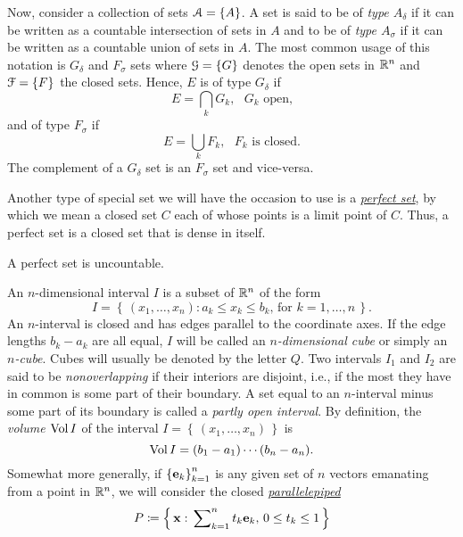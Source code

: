 Now, consider a collection of sets $\mathcal{A}=\{A\}$. A set is said to be of
\emph{type $A_\delta$} if it can be written as a countable intersection of
sets in $A$ and to be of \emph{type $A_\sigma$} if it can be written as a
countable union of sets in $A$. The most common usage of this notation is
$G_\delta$ and $F_\sigma$ sets where $\mathcal{G}=\{G\}$ denotes the open sets in
$\mathbb{R}^n$ and $\mathcal{F}=\{F\}$ the closed sets. Hence, $E$ is of type
\href{https://en.wikipedia.org/wiki/G-delta_set}{$G_\delta$} if
\begin{equation}
  \label{eq:1:g-delta-set}
E=\bigcap_k G_k,\text{ $G_k$ open,}
\end{equation}
and of type \href{https://en.wikipedia.org/wiki/F-sigma_set}{$F_\sigma$} if
\begin{equation}
  \label{eq:1:f-sigma}
E=\bigcup_k F_k,\text{ $F_k$ is closed.}
\end{equation}
The complement of a $G_\delta$ set is an $F_\sigma$ set and vice-versa.

Another type of special set we will have the occasion to use is a
\href{https://en.wikipedia.org/wiki/Perfect_set}{\emph{perfect set}}, by
which we mean a closed set $C$ each of whose points is a limit point of
$C$. Thus, a perfect set is a closed set that is dense in itself.

\begin{theorem}[1.9]
A perfect set is uncountable.
\end{theorem}

An $n$-dimensional interval $I$ is a subset of $\mathbb{R}^n$ of the form
\begin{equation}
\label{eq:1:n-interval}
I=\left\{\,(x_1,\dotsc,x_n):\text{$a_k\leq x_k\leq b_k$, for $k=1,\dotsc,n$}\,\right\}.
\end{equation}
An $n$-interval is closed and has edges parallel to the coordinate axes. If
the edge lengths $b_k-a_k$ are all equal, $I$ will be called an
\emph{$n$-dimensional cube} or simply an \emph{$n$-cube}. Cubes will
usually be denoted by the letter $Q$. Two intervals $I_1$ and $I_2$ are
said to be \emph{nonoverlapping} if their interiors are disjoint, i.e., if
the most they have in common is some part of their boundary. A set equal to
an $n$-interval minus some part of its boundary is called a \emph{partly
  open interval}. By definition, the \emph{volume $\operatorname{Vol} I$} of the interval
$I=\left\{\,(x_1,\dotsc,x_n)\,\right\}$ is
\begin{equation}
  \label{eq:1:volume-of-n-interval}
\operatorname{Vol} I=(b_1-a_1)\dotsm(b_n-a_n).
\end{equation}
Somewhat more generally, if ${\{\mathbf{e}_k\}}_{k=1}^n$ is any given set of $n$
vectors emanating from a point in $\mathbb{R}^n$, we will consider the closed
\href{}{\emph{parallelepiped}}
\begin{equation}
  \label{eq:1:parallelepiped}
P\coloneqq\left\{\,\mathbf{x}:\text{$\sideset{}{_{k=1}^n}\sum t_k\mathbf{e}_k$, $0\leq
    t_k\leq 1$}\,\right\}
\end{equation}

